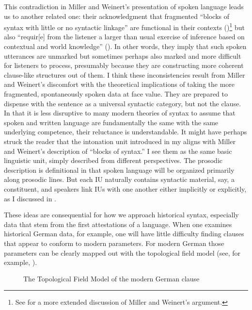 This contradiction in Miller and Weinert’s presentation of spoken language leads us to another related one: their acknowledgment that fragmented “blocks of syntax with little or no syntactic linkage” are functional in their contexts (\citealt[60--61]{MillerWeinert1998})\footnote{{See  for a more extended discussion of Miller and Weinert’s argument.} } but also “requir[e] from the listener a larger than usual exercise of inference based on contextual and world knowledge” (\citealt[28]{MillerWeinert1998}). In other words, they imply that such spoken utterances are unmarked but sometimes perhaps also marked and more difficult for listeners to process, presumably because they are constructing more coherent clause-like structures out of them. I think these inconsistencies result from Miller and Weinert’s discomfort with the theoretical implications of taking the more fragmented, spontaneously spoken data at face value. They are prepared to dispense with the sentence as a universal syntactic category, but not the clause. In that it is less disruptive to many modern theories of syntax to assume that spoken and written language are fundamentally the same with the same underlying competence, their reluctance is understandable. It might have perhaps struck the reader that the intonation unit introduced in my  aligns with Miller and Weinert’s description of “blocks of syntax.” I see them as the same basic linguistic unit, simply described from different perspectives. The prosodic description is definitional in that spoken language will be organized primarily along prosodic lines. But each IU naturally contains syntactic material, say, a constituent, and speakers link IUs with one another either implicitly or explicitly, as I discussed in .

These ideas are consequential for how we approach historical syntax, especially data that stem from the first attestations of a language. When one examines historical German data, for example, one will have little difficulty finding clauses that appear to conform to modern parameters. For modern German those parameters can be clearly mapped out with the topological field model (see, for example, \citealt[53--54]{Wöllstein-LeistenEtAl1997}).

\begin{figure}
\caption{The Topological Field Model of the modern German clause}
\label{fig:7:7.1}
\end{figure}

